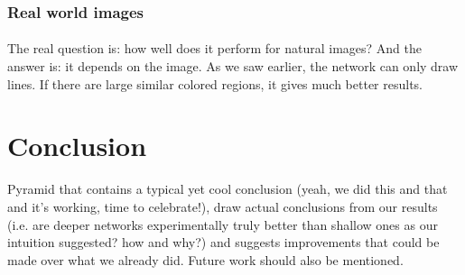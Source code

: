 \documentclass[a4paper]{article}
\begin{document}
\subsubsection{Real world images}

\paragraph{}The real question is: how well does it perform for natural images? And the answer is: it depends on the image. As we saw earlier, the network can only draw lines. If there are large similar colored regions, it gives much better results.

\section{Conclusion}
Pyramid that contains a typical yet cool conclusion (yeah, we did this and that and it's working, time to celebrate!), draw actual conclusions from our results (i.e. are deeper networks experimentally truly better than shallow ones as our intuition suggested? how and why?) and suggests improvements that could be made over what we already did. Future work should also be mentioned.



\end{document}
